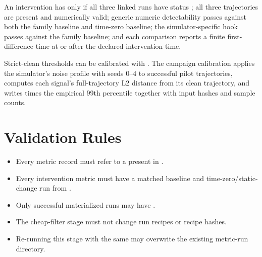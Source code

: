 \documentclass[11pt]{article}
\begin{document}
An intervention has  only if all three linked runs have status ; all three trajectories are present and numerically valid; generic numeric detectability passes against both the family baseline and time-zero baseline; the simulator-specific hook passes against the family baseline; and each comparison reports a finite first-difference time at or after the declared intervention time.

Strict-clean thresholds can be calibrated with .
The campaign calibration applies the simulator's  noise profile with seeds 0--4 to successful pilot trajectories, computes each signal's full-trajectory L2 distance from its clean trajectory, and writes  times the empirical 99th percentile together with input hashes and sample counts.

\section*{Validation Rules}

\begin{itemize}
\item Every metric record must refer to a  present in .
\item Every intervention metric must have a matched baseline and time-zero/static-change run from .
\item Only successful materialized runs may have .
\item The cheap-filter stage must not change run recipes or recipe hashes.
\item Re-running this stage with the same  may overwrite the existing metric-run directory.
\end{itemize}
\end{document}
